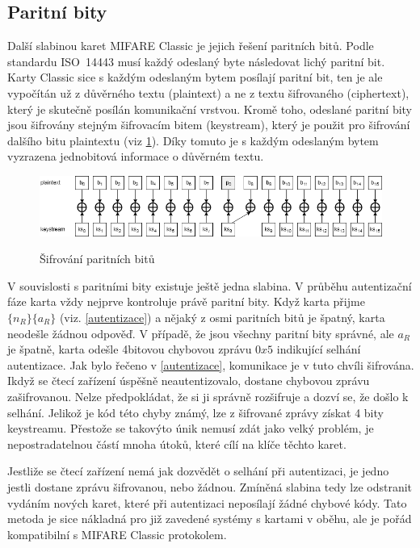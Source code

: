 \subsection{Paritní bity}
\label{paritni_bity}
Další slabinou karet MIFARE Classic je jejich řešení paritních bitů. Podle standardu ISO~14443 musí každý odeslaný byte následovat lichý paritní bit. Karty Classic sice s každým odeslaným bytem posílají paritní bit, ten je ale vypočítán už z důvěrného textu (plaintext) a ne z textu šifrovaného (ciphertext), který je skutečně posílán komunikační vrstvou. Kromě toho, odeslané paritní bity jsou šifrovány stejným šifrovacím bitem (keystream), který je použit pro šifrování dalšího bitu plaintextu (viz \ref{parityDiagram})\cite{Cryptanalisis}.
Díky tomuto je s každým odeslaným bytem vyzrazena jednobitová informace o důvěrném textu\cite{Dismantling_Mifare_Classic}. 
\begin{figure}[ht]\centering
  \centering
  \includegraphics[width=\linewidth]{obrazky-figures/parityBits.png}\\[1pt]  
  \caption{Šifrování paritních bitů \cite{Cryptanalisis}}   
  \label{parityDiagram}
\end{figure}
\par
V souvislosti s paritními bity existuje ještě jedna slabina. V průběhu autentizační fáze karta vždy nejprve kontroluje právě paritní bity. Když karta přijme $\{n_R\}\{a_R\}$ (viz. \ref{autentizace}) a nějaký z osmi paritních bitů je špatný, karta neodešle žádnou odpověď. V případě, že jsou všechny paritní bity správné, ale $a_R$ je špatně, karta odešle 4bitovou chybovou zprávu $0x5$ indikující selhání autentizace. Jak bylo řečeno v \ref{autentizace}, komunikace je v tuto chvíli šifrována. Ikdyž se čtecí zařízení úspěšně neautentizovalo, dostane chybovou zprávu zašifrovanou. Nelze předpokládat, že si ji správně rozšifruje a dozví se, že došlo k selhání.
Jelikož je kód této chyby známý, lze z šifrované zprávy získat 4 bity keystreamu. Přestože se takovýto únik nemusí zdát jako velký problém, je nepostradatelnou částí mnoha útoků, které cílí na klíče těchto karet.
\par
Jestliže se čtecí zařízení nemá jak dozvědět o selhání při autentizaci, je jedno jestli dostane zprávu šifrovanou, nebo žádnou. Zmíněná slabina tedy lze odstranit vydáním nových karet, které při autentizaci neposílají žádné chybové kódy. Tato metoda je sice nákladná pro již zavedené systémy s kartami v oběhu, ale je pořád kompatibilní s MIFARE Classic protokolem\cite{Cryptanalisis}. 

